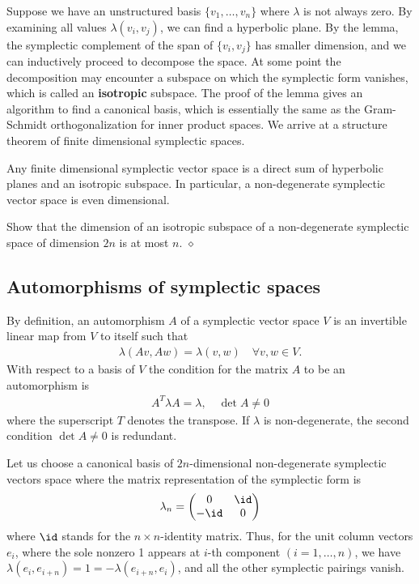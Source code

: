Suppose we have an unstructured basis $\{v_1, \ldots, v_n \}$ where $\lambda$ is not always zero.
By examining all values $\lambda(v_i,v_j)$,
we can find a hyperbolic plane.
By the lemma, the symplectic complement of the span of $\{ v_i , v_j \}$ has smaller dimension,
and we can inductively proceed to decompose the space.
At some point the decomposition may encounter a
subspace on which the symplectic form vanishes,
which is called an {\bf isotropic} subspace.
The proof of the lemma gives an algorithm to find a canonical basis,
which is essentially the same as the Gram-Schmidt
orthogonalization for inner product spaces.
We arrive at a structure theorem of finite dimensional symplectic spaces.
\begin{prop}
Any finite dimensional symplectic vector space is a direct sum of hyperbolic planes
and an isotropic subspace.
In particular, a non-degenerate symplectic vector space is even dimensional.
\label{SymplecticSpaceStructure}
\end{prop}
\begin{exc}
Show that the dimension of an isotropic subspace of a non-degenerate symplectic space of dimension $2n$
is at most $n$.
\hfill $\diamond$ \end{exc}


\subsection{Automorphisms of symplectic spaces}

By definition, an automorphism $A$ of a symplectic vector space
$V$ is an invertible linear map from $V$ to itself such that
\begin{align}
\lambda( Av, Aw ) = \lambda( v,w) \quad \forall v,w \in V .
\label{PreservingSymplecticForm}
\end{align}
With respect to a basis of $V$
 the condition for the matrix $A$ to be an automorphism is 
\begin{align}
A^T \lambda A = \lambda, \quad \det A \neq 0 
\end{align}
where the superscript $T$ denotes the transpose.
If $\lambda$ is non-degenerate, the second condition $\det A \neq 0$ is redundant.

Let us choose a canonical basis of $2n$-dimensional non-degenerate symplectic vectors space where
the matrix representation of the symplectic form is
\begin{align}
\lambda_n =
\begin{pmatrix}
0 & \id \\ -\id & 0
\end{pmatrix}
\label{eq:symplecticMatrix}
\end{align}
where $\id$ stands for the $n \times n$-identity matrix.
Thus, for the unit column vectors $e_i$, where the sole nonzero 1 appears at $i$-th component $(i = 1,\ldots, n)$,
we have $\lambda(e_i, e_{i+n}) = 1 = - \lambda(e_{i+n},e_i)$,
and all the other symplectic pairings vanish.

